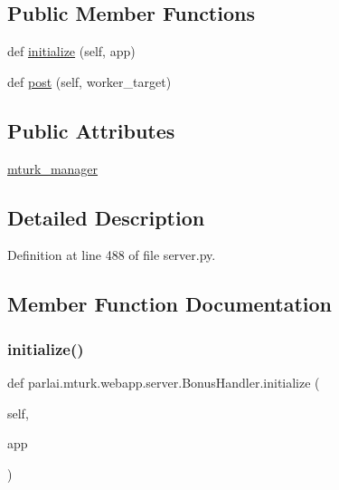 \subsection*{Public Member Functions}
\begin{DoxyCompactItemize}
\item 
def \hyperlink{classparlai_1_1mturk_1_1webapp_1_1server_1_1BonusHandler_aa29383ea72a9d3e93e75a0689bc6db1e}{initialize} (self, app)
\item 
def \hyperlink{classparlai_1_1mturk_1_1webapp_1_1server_1_1BonusHandler_acdeaf6529109287285903ed8babe864c}{post} (self, worker\+\_\+target)
\end{DoxyCompactItemize}
\subsection*{Public Attributes}
\begin{DoxyCompactItemize}
\item 
\hyperlink{classparlai_1_1mturk_1_1webapp_1_1server_1_1BonusHandler_a9cfd41f9f9ca83eae4d3f8d5f54b8d03}{mturk\+\_\+manager}
\end{DoxyCompactItemize}


\subsection{Detailed Description}


Definition at line 488 of file server.\+py.



\subsection{Member Function Documentation}
\mbox{\label{classparlai_1_1mturk_1_1webapp_1_1server_1_1BonusHandler_aa29383ea72a9d3e93e75a0689bc6db1e}} 
\subsubsection{\texorpdfstring{initialize()}{initialize()}}
{\footnotesize\ttfamily def parlai.\+mturk.\+webapp.\+server.\+Bonus\+Handler.\+initialize (\begin{DoxyParamCaption}\item[{}]{self,  }\item[{}]{app }\end{DoxyParamCaption})}



